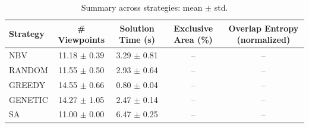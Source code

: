 \begin{table}[t]
\centering
\caption{Summary across strategies: mean $\pm$ std.}
\label{tab:summary_strategies}
\begin{tabular}{lcccc}
\toprule
Strategy & \# Viewpoints & Solution Time (s) & Exclusive Area (\%) & Overlap Entropy (normalized) \\
\midrule
NBV & 11.18 $\pm$ 0.39 & 3.29 $\pm$ 0.81 & -- & -- \\
RANDOM & 11.55 $\pm$ 0.50 & 2.93 $\pm$ 0.64 & -- & -- \\
GREEDY & 14.55 $\pm$ 0.66 & 0.80 $\pm$ 0.04 & -- & -- \\
GENETIC & 14.27 $\pm$ 1.05 & 2.47 $\pm$ 0.14 & -- & -- \\
SA & 11.00 $\pm$ 0.00 & 6.47 $\pm$ 0.25 & -- & -- \\
\bottomrule
\end{tabular}
\end{table}
